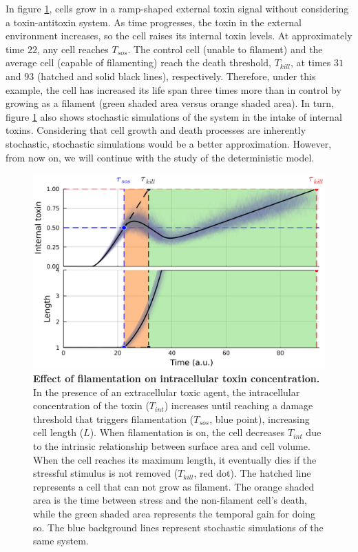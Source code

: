 \documentclass[a4paper, nobind]{templates/ociamthesis}
\begin{document}
In figure \ref{fig:filamentation-model-ramp-signal}, cells grow in a ramp-shaped external toxin signal without considering a toxin-antitoxin system. As time progresses, the toxin in the external environment increases, so the cell raises its internal toxin levels. At approximately time \(22\), any cell reaches \(T_{sos}\). The control cell (unable to filament) and the average cell (capable of filamenting) reach the death threshold, \(T_{kill}\), at times \(31\) and \(93\) (hatched and solid black lines), respectively. Therefore, under this example, the cell has increased its life span three times more than in control by growing as a filament (green shaded area versus orange shaded area). In turn, figure \ref{fig:filamentation-model-ramp-signal} also shows stochastic simulations of the system in the intake of internal toxins. Considering that cell growth and death processes are inherently stochastic, stochastic simulations would be a better approximation. However, from now on, we will continue with the study of the deterministic model.





\begin{figure}[H]
\includegraphics[width=1\linewidth]{downloadFigs4latex__main/filamentation-model-ramp-signal} \caption[Effect of filamentation on intracellular toxin concentration.]{\textbf{Effect of filamentation on intracellular toxin concentration.} In the presence of an extracellular toxic agent, the intracellular concentration of the toxin (\(T_{int}\)) increases until reaching a damage threshold that triggers filamentation (\(T_{sos}\), blue point), increasing cell length (\(L\)). When filamentation is on, the cell decreases \(T_{int}\) due to the intrinsic relationship between surface area and cell volume. When the cell reaches its maximum length, it eventually dies if the stressful stimulus is not removed (\(T_{kill}\), red dot). The hatched line represents a cell that can not grow as filament. The orange shaded area is the time between stress and the non-filament cell's death, while the green shaded area represents the temporal gain for doing so. The blue background lines represent stochastic simulations of the same system.}\label{fig:filamentation-model-ramp-signal}
\end{figure}
\end{document}
